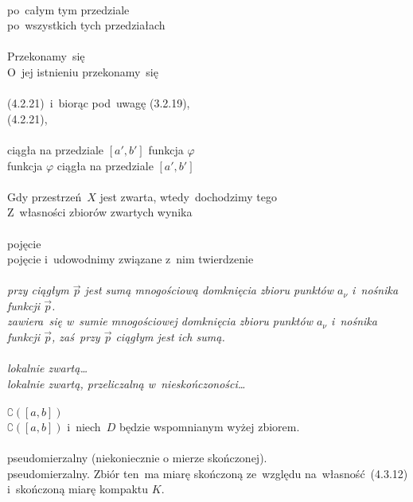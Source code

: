 \documentclass[a4paper,11pt]{article}
\begin{document}
 \\
\Jest po~całym tym przedziale \\
\Pow  po~wszystkich tych przedziałach \\
 \\
\Jest Przekonamy~się \\
\Pow  O~jej istnieniu przekonamy~się \\
 \\
\Jest (4.2.21)~i~biorąc pod~uwagę (3.2.19), \\
\Pow (4.2.21), \\
 \\
\Jest ciągła na przedziale $[ a', b' ]$ funkcja $\varphi$ \\
\Pow  funkcja $\varphi$ ciągła na przedziale $[ a', b' ]$ \\
 \\
\Jest Gdy przestrzeń~$X$ jest zwarta, wtedy~dochodzimy tego \\
\Pow  Z~własności zbiorów zwartych wynika \\
 \\
\Jest pojęcie \\
\Pow  pojęcie i~udowodnimy związane z~nim twierdzenie \\
 \\
\Jest \emph{przy ciągłym $\vec{ p }$ jest sumą mnogościową domknięcia
  zbioru punktów $a_{ \nu }$ i~nośnika
  funkcji $\vec{ p }$.} \\
\Pow \emph{zawiera~się w~sumie mnogościowej domknięcia zbioru punktów
  $a_{ \nu }$ i~nośnika funkcji $\vec{ p }$, zaś~przy $\vec{ p }$
  ciągłym jest ich sumą.} \\
 \\
\Jest \emph{lokalnie zwartą\ldots} \\
\Pow  \emph{lokalnie zwartą, przeliczalną w~nieskończoności\ldots} \\
 \\
\Jest $\complement ( [ a, b ] )$ \\
\Pow $\complement ( [ a, b ] )$ i~niech~$D$ będzie wspomnianym wyżej
zbiorem. \\
 \\
\Jest pseudomierzalny (niekoniecznie o mierze skończonej). \\
\Pow pseudomierzalny. Zbiór ten~ma miarę skończoną ze~względu
na~własność~(4.3.12) i~skończoną miarę kompaktu $K$. \\
\end{document}
